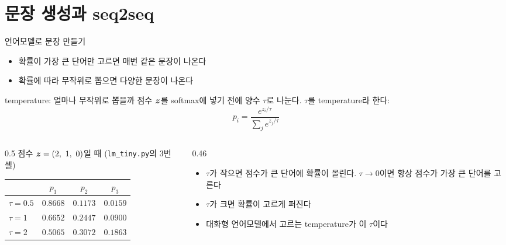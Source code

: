 \documentclass[aspectratio=169,11pt]{beamer}
\begin{document}
\section{문장 생성과 seq2seq}

\begin{frame}{언어모델로 문장 만들기}
\vskip2mm
\begin{itemize}
\item 확률이 가장 큰 단어만 고르면 매번 같은 문장이 나온다
\item 확률에 따라 무작위로 뽑으면 다양한 문장이 나온다
\end{itemize}
\end{frame}

\begin{frame}{temperature: 얼마나 무작위로 뽑을까}
점수 $\bm{z}$를 softmax에 넣기 전에 양수 $\tau$로 나눈다. $\tau$를 temperature라 한다:
\[
p_i=\frac{e^{z_i/\tau}}{\sum_je^{z_j/\tau}}
\]
\begin{columns}[c,onlytextwidth]
\begin{column}{0.5\textwidth}
\centering
\small
점수 $\vect z=(2,\ 1,\ 0)$일 때 (\texttt{lm\_tiny.py}의 3번 셀)
\vskip1mm
\begin{tabular}{@{}lccc@{}}
\toprule
& $p_1$ & $p_2$ & $p_3$ \\
\midrule
$\tau=0.5$ & $0.8668$ & $0.1173$ & $0.0159$ \\
$\tau=1$ & $0.6652$ & $0.2447$ & $0.0900$ \\
$\tau=2$ & $0.5065$ & $0.3072$ & $0.1863$ \\
\bottomrule
\end{tabular}
\end{column}
\begin{column}{0.46\textwidth}
\begin{itemize}
\item $\tau$가 작으면 점수가 큰 단어에 확률이 몰린다.
$\tau\to0$이면 항상 점수가 가장 큰 단어를 고른다
\item $\tau$가 크면 확률이 고르게 퍼진다
\item 대화형 언어모델에서 고르는 temperature가 이 $\tau$이다
\end{itemize}
\end{column}
\end{columns}
\end{frame}
\end{document}
